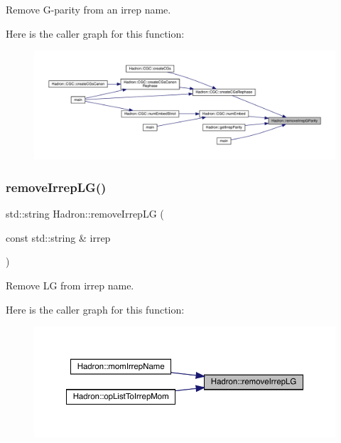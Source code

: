Remove G-\/parity from an irrep name. 

Here is the caller graph for this function\+:
\nopagebreak
\begin{figure}[H]
\begin{center}
\leavevmode
\includegraphics[width=350pt]{d1/daf/namespaceHadron_a6c2109897dff664c15b3fe81aa7d8917_icgraph}
\end{center}
\end{figure}
\mbox{\label{namespaceHadron_aff55b5fd81ffee95432b7d4e1c8d01e6}} 
\subsubsection{\texorpdfstring{removeIrrepLG()}{removeIrrepLG()}}
{\footnotesize\ttfamily std\+::string Hadron\+::remove\+Irrep\+LG (\begin{DoxyParamCaption}\item[{const std\+::string \&}]{irrep }\end{DoxyParamCaption})}



Remove LG from irrep name. 

Here is the caller graph for this function\+:
\nopagebreak
\begin{figure}[H]
\begin{center}
\leavevmode
\includegraphics[width=350pt]{d1/daf/namespaceHadron_aff55b5fd81ffee95432b7d4e1c8d01e6_icgraph}
\end{center}
\end{figure}
\mbox{\label{namespaceHadron_ab3424b316e2a4d8e820c88f8027742e1}} 
